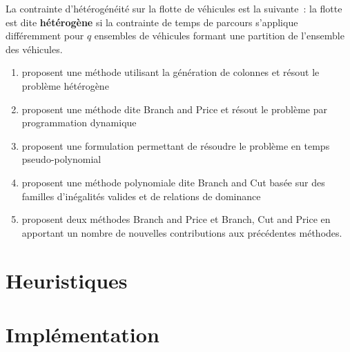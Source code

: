 \documentclass[a4paper]{scrartcl}
\begin{document}
La contrainte d'hétérogénéité sur la flotte de véhicules est la suivante~: la
flotte est dite \textbf{hétérogène} si la contrainte de temps de parcours
s'applique différemment pour $q$ ensembles de véhicules formant une partition
de l'ensemble des véhicules.

\begin{enumerate}
	\item \cite{butt.ryan_apr1999} proposent une méthode utilisant la génération
		de colonnes et résout le problème hétérogène
	\item \cite{boussier.etal_sep2007} proposent une méthode dite
		\foreignlanguage{UKenglish}{Branch and Price} et résout le
		problème par programmation dynamique
	\item \cite{poggi.etal_2010} proposent une formulation permettant de
		résoudre le problème en temps pseudo-polynomial
	\item \cite{dang.etal_may2013} proposent une méthode polynomiale dite
		\foreignlanguage{UKenglish}{Branch and Cut} basée sur des
		familles d'inégalités valides et de relations de dominance 
	\item \cite{keshtkaran.etal_jan2016} proposent deux méthodes
		\foreignlanguage{UKenglish}{Branch and Price} et
		\foreignlanguage{UKenglish}{Branch, Cut and Price} en apportant
		un nombre de nouvelles contributions aux précédentes méthodes.
\end{enumerate}

\section{Heuristiques}%
\label{sec:heuristiques}

\section{Implémentation}
\label{sec:implementation}

\printnoidxglossary[type=acronym]
\printbibliography
\end{document}
